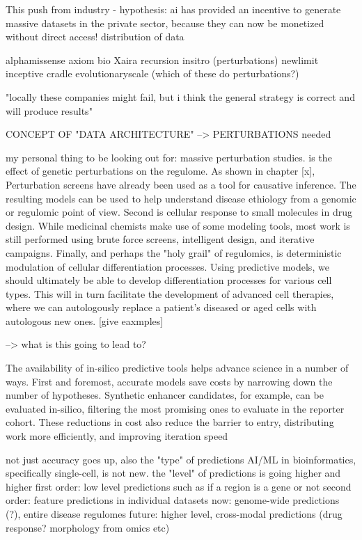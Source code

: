 
This push from industry - hypothesis: ai has provided an incentive to generate massive datasets in the private sector, because they can now be monetized without direct access! distribution of data

alphamissense
axiom bio
Xaira
recursion
insitro (perturbations)
newlimit
inceptive
cradle
evolutionaryscale
(which of these do perturbations?)

"locally these companies might fail, but i think the general strategy is correct and will produce results"

CONCEPT OF "DATA ARCHITECTURE" --> PERTURBATIONS needed

my personal thing to be looking out for: massive perturbation studies. is the effect of genetic perturbations on the regulome. As shown in chapter [x], Perturbation screens have already been used as a tool for causative inference. The resulting models can be used to help understand disease ethiology from a genomic or regulomic point of view. Second is cellular response to small molecules in drug design. While medicinal chemists make use of some modeling tools, most work is still performed using brute force screens, intelligent design, and iterative campaigns. Finally, and perhaps the "holy grail" of regulomics, is deterministic modulation of cellular differentiation processes. Using predictive models, we should ultimately be able to develop differentiation processes for various cell types. This will in turn facilitate the development of advanced cell therapies, where we can autologously replace a patient's diseased or aged cells with autologous new ones. [give eaxmples]

--> what is this going to lead to?

The availability of in-silico predictive tools helps advance science in a number of ways. First and foremost, accurate models save costs by narrowing down the number of hypotheses. Synthetic enhancer candidates, for example, can be evaluated in-silico, filtering the most promising ones to evaluate in the reporter cohort. These reductions in cost also reduce the barrier to entry, distributing work more efficiently, and improving iteration speed

not just accuracy goes up, also the "type" of predictions
AI/ML in bioinformatics, specifically single-cell, is not new.
the "level" of predictions is going higher and higher
first order: low level predictions such as if a region is a gene or not
second order: feature predictions in individual datasets
now: genome-wide predictions (?), entire disease regulomes
future: higher level, cross-modal predictions (drug response? morphology from omics etc)

